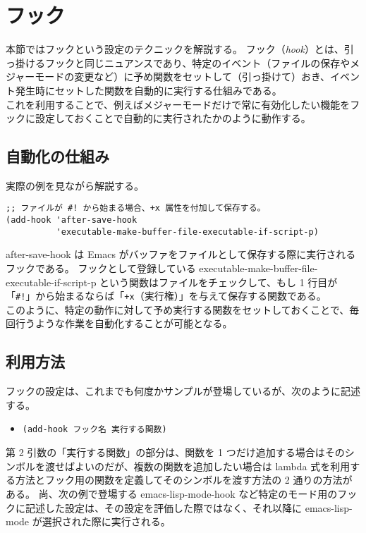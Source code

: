\section{フック}
本節ではフックという設定のテクニックを解説する。
フック（\emph{hook}）とは、引っ掛けるフックと同じニュアンスであり、特定のイベント（ファイルの保存やメジャーモードの変更など）に予め関数をセットして（引っ掛けて）おき、イベント発生時にセットした関数を自動的に実行する仕組みである。\\

これを利用することで、例えばメジャーモードだけで常に有効化したい機能をフックに設定しておくことで自動的に実行されたかのように動作する。
\subsection{自動化の仕組み}
実際の例を見ながら解説する。
\begin{mdframed}[roundcorner=0.50zw,leftmargin=3.00zw,rightmargin=3.00zw,skipabove=0.40zw,skipbelow=0.40zw,innertopmargin=4.00pt,innerbottommargin=4.00pt,innerleftmargin=5.00pt,innerrightmargin=5.00pt,linecolor=gray!020,linewidth=0.50pt,backgroundcolor=gray!20]
\begin{verbatim}
;; ファイルが #! から始まる場合、+x 属性を付加して保存する。
(add-hook 'after-save-hook
          'executable-make-buffer-file-executable-if-script-p)
\end{verbatim}
\end{mdframed}
after-save-hook は Emacs がバッファをファイルとして保存する際に実行されるフックである。
フックとして登録している executable-make-buffer-file-executable-if-script-p という関数はファイルをチェックして、もし 1 行目が「\texttt{\#!}」から始まるならば「\texttt{+x}（実行権）」を与えて保存する関数である。\\

このように、特定の動作に対して予め実行する関数をセットしておくことで、毎回行うような作業を自動化することが可能となる。
\subsection{利用方法}
フックの設定は、これまでも何度かサンプルが登場しているが、次のように記述する。
\begin{itemize}\setlength{\leftskip}{-1.00zw}%
\item[] \texttt{(add-hook フック名 実行する関数)}
\end{itemize}
第 2 引数の「実行する関数」の部分は、関数を 1 つだけ追加する場合はそのシンボルを渡せばよいのだが、複数の関数を追加したい場合は lambda 式を利用する方法とフック用の関数を定義してそのシンボルを渡す方法の 2 通りの方法がある。
尚、次の例で登場する emacs-lisp-mode-hook など特定のモード用のフックに記述した設定は、その設定を評価した際ではなく、それ以降に emacs-lisp-mode が選択された際に実行される。
